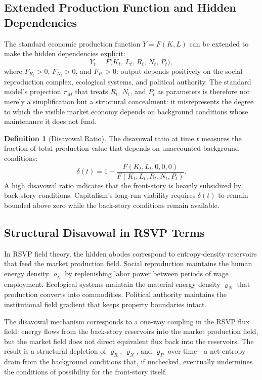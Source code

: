 \documentclass[12pt,a4paper]{article}
\theoremstyle{definition}
\newtheorem{definition}{Definition}[section]
\theoremstyle{remark}
\begin{document}
\subsection{Extended Production Function and Hidden Dependencies}

The standard economic production function $Y = F(K, L)$ can be extended to make the hidden dependencies explicit:
\begin{equation}
  \label{eq:extended_production}
  Y_t = F\bigl(K_t,\, L_t,\, R_t,\, N_t,\, P_t\bigr),
\end{equation}
where $F_{R_t} > 0$, $F_{N_t} > 0$, and $F_{P_t} > 0$: output depends positively on the social reproduction complex, ecological systems, and political authority. The standard model's projection $\pi_M$ that treats $R_t$, $N_t$, and $P_t$ as parameters is therefore not merely a simplification but a structural concealment: it misrepresents the degree to which the visible market economy depends on background conditions whose maintenance it does not fund.

\begin{definition}[Disavowal Ratio]
The disavowal ratio at time $t$ measures the fraction of total production value that depends on unaccounted background conditions:
\begin{equation}
  \delta(t) = 1 - \frac{F(K_t, L_t, 0, 0, 0)}{F(K_t, L_t, R_t, N_t, P_t)}.
\end{equation}
A high disavowal ratio indicates that the front-story is heavily subsidized by back-story conditions. Capitalism's long-run viability requires $\delta(t)$ to remain bounded above zero while the back-story conditions remain available.
\end{definition}

\subsection{Structural Disavowal in RSVP Terms}

In RSVP field theory, the hidden abodes correspond to entropy-density reservoirs that feed the market production field. Social reproduction maintains the human energy density $\varrho_L$ by replenishing labor power between periods of wage employment. Ecological systems maintain the material energy density $\varrho_N$ that production converts into commodities. Political authority maintains the institutional field gradient that keeps property boundaries intact.

The disavowal mechanism corresponds to a one-way coupling in the RSVP flux field: energy flows from the back-story reservoirs into the market production field, but the market field does not direct equivalent flux back into the reservoirs. The result is a structural depletion of $\varrho_R$, $\varrho_N$, and $\varrho_P$ over time---a net entropy drain from the background conditions that, if unchecked, eventually undermines the conditions of possibility for the front-story itself.
\end{document}
